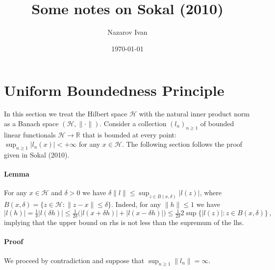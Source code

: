 \documentclass[a4paper]{article}
\title{Some notes on Sokal (2010)}
\author{Nazarov Ivan}
\date{\today}
\newcommand{\Hcal}{\mathcal{H}}
\newcommand{\real}{\mathbb{R}}
\begin{document}
\maketitle

\section*{Uniform Boundedness Principle} %
\label{sec:uniform_boundedness_principle}

In this section we treat the Hilbert space $\Hcal$ with the natural inner product
norm as a Banach space $(\Hcal, \|\cdot\|)$. Consider a collection $(l_n)_{n\geq1}$
of bounded linear functionals $\Hcal\to\real$ that is bounded at every point:
$\sup_{n\geq1} \lvert l_n(x)\rvert < +\infty$ for any $x \in \Hcal$. The following
section follows the proof given in Sokal (2010).\footnotemark
{}

\paragraph{Lemma} %
\label{par:lemma}

For any $x\in \Hcal$ and $\delta > 0$ we have $\delta \|l\| \leq \sup_{z\in B(x, \delta)}
\lvert l(z) \rvert$, where $B(x, \delta) = \{z\in \Hcal\colon \|z-x\| \leq \delta\}$.
Indeed, for any $\|h\| \leq 1$ we have 
\begin{equation*}
  \lvert l(h) \rvert
    = \tfrac1\delta \lvert l(\delta h) \rvert
    \leq \tfrac1{2 \delta} \bigl(
      \lvert l(x + \delta h) \rvert + \lvert l(x - \delta h) \rvert
    \bigr)
    \leq \tfrac1{2 \delta}
      2 \sup\{\lvert l(z) \rvert \colon z\in B(x, \delta)\}
      \,,
\end{equation*}
implying that the upper bound on rhs is not less than the supremum of the lhs.


\paragraph{Proof} %
\label{par:proof}

We proceed by contradiction and suppose that $\sup_{n\geq1} \|l_n\| = \infty$.
\end{document}
